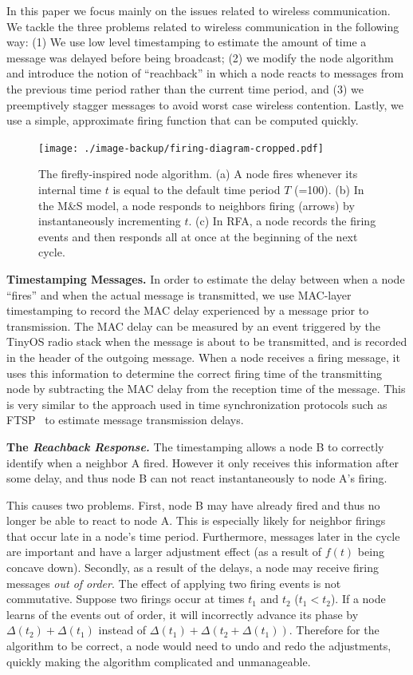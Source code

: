 \documentclass{sig-alternate}
\begin{document}
In this paper we focus mainly on the issues related to wireless
communication. We tackle the three problems related to wireless
communication in the following way: (1) We use low level timestamping
to estimate the amount of time a message was delayed before being
broadcast; (2) we modify the node algorithm and introduce the notion
of ``reachback'' in which a node reacts to messages from the previous
time period rather than the current time period, and (3) we
preemptively stagger messages to avoid worst case wireless contention.
Lastly, we use a simple, approximate firing function that can be
computed quickly.

\begin{figure}[t]
\begin{center}
\texttt{[image: ./image-backup/firing-diagram-cropped.pdf]}
\end{center}
\caption{The firefly-inspired node algorithm. (a) A node fires
whenever its internal time $t$ is equal to the default time period $T$
(=100). (b) In the M\&S model, a node responds to neighbors firing
(arrows) by instantaneously incrementing $t$. (c) In RFA, a node
records the firing events and then responds all at once at the
beginning of the next cycle.}
\label{fig:firefly-example}
\end{figure}


{\bf Timestamping Messages.} In order to estimate the delay between
when a node ``fires'' and when the actual message is transmitted, we
use MAC-layer timestamping to record the MAC delay experienced by a
message prior to transmission. The MAC delay can be measured by an
event triggered by the TinyOS radio stack when the message is about to
be transmitted, and is recorded in the header of the outgoing message.
When a node receives a firing message, it uses this information to
determine the correct firing time of the transmitting node by
subtracting the MAC delay from the reception time of the message. This
is very similar to the approach used in time synchronization protocols
such as FTSP~\cite{ftsp} to estimate message transmission delays.

{\bf The {\em Reachback Response.}} The timestamping allows a node B
to correctly identify when a neighbor A fired. However it only
receives this information after some delay, and thus node B can not
react instantaneously to node A's firing.

This causes two problems. First, node B may have already fired and
thus no longer be able to react to node A. This is especially likely
for neighbor firings that occur late in a node's time
period. Furthermore, messages later in the cycle are important and
have a larger adjustment effect (as a result of $f(t)$ being concave
down). Secondly, as a result of the delays, a node may receive firing
messages {\em out of order}. The effect of applying two firing events
is not commutative. Suppose two firings occur at times $t_1$ and $t_2$
($t_1<t_2$). If a node learns of the events out of order, it will
incorrectly advance its phase by $\Delta(t_2) + \Delta(t_1)$ instead
of $\Delta(t_1) + \Delta(t_2 + \Delta(t_1))$. Therefore for the
algorithm to be correct, a node would need to undo and redo the
adjustments, quickly making the algorithm complicated and
unmanageable.
\end{document}
